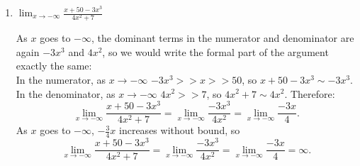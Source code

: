 \documentclass{article}
\begin{document}
\begin{enumerate}
\begin{enumerate}
    \begin{solution}
      As $x$ goes to $\infty$, the dominant term in the numerator is $-3x^3$, and the dominant term in the
      denominator is $4x^2$, so here is how we write this formally:\\
      In the numerator, as $x\to\infty$ $-3x^3>>x>>50$, so $x+50-3x^3 \sim -3x^3$.\\
      In the denominator, as $x\to \infty$ $4x^2>>7$, so $4x^2+7 \sim 4x^2$. Therefore: 
      \begin{align*}
        \lim_{x \to \infty} \frac{x + 50 - 3x^3}{4x^2 + 7} &= \lim_{x \to \infty} \frac{-3x^3}{4x^2} \\
        \intertext{We can use algebra to simplify this limit.}
        \lim_{x \to \infty} \frac{x + 50 - 3x^3}{4x^2 + 7} &= \lim_{x \to \infty} \frac{-3x}{4} \\
        \intertext{As $x$ goes to $\infty$, $-\frac{3}{4}x$ decreases without bound, so}
        \lim_{x \to \infty} \frac{x + 50 - 3x^3}{4x^2 + 7} &= -\infty.
      \end{align*}
    \end{solution}

  \item
    \begin{problem}[\vfill]
      $\displaystyle \lim_{x \to -\infty} \frac{x + 50- 3x^3}{4x^2 + 7}$      
    \end{problem}

    \begin{solution}
      As $x$ goes to $-\infty$, the dominant terms in the numerator and denominator are again $-3x^3$
      and $4x^2$, so we would write the formal part of the argument exactly the same:\\
       In the numerator, as $x\to -\infty$ $-3x^3>>x>>50$, so $x+50-3x^3 \sim -3x^3$.\\
      In the denominator, as $x\to-\infty$ $4x^2>>7$, so $4x^2+7 \sim 4x^2$. Therefore: 
      \[\lim_{x \to -\infty} \frac{x + 50 - 3x^3}{4x^2 + 7} = \lim_{x \to -\infty} \frac{-3x^3}{4x^2}
      = \lim_{x \to -\infty} \frac{-3x}{4}.\]
      As $x$ goes to $-\infty$, $-\frac{3}{4}x$ increases without bound, so
      \[\lim_{x \to -\infty} \frac{x + 50 - 3x^3}{4x^2 + 7} = \lim_{x \to -\infty} \frac{-3x^3}{4x^2}
      = \lim_{x \to -\infty} \frac{-3x}{4} = \infty.\]
    \end{solution}

  \end{enumerate}


\end{enumerate}
\end{document}
